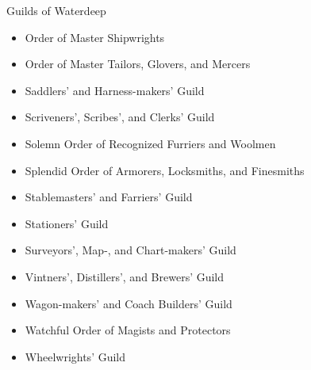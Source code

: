 \documentclass[10pt,a4paper,twoside,twocolumn,openany,nodeprecatedcode]{dndbook}
\begin{document}
\begin{DndComment}{Guilds of Waterdeep}
\begin{itemize}
\item Order of Master Shipwrights
\item Order of Master Tailors, Glovers, and Mercers
\item Saddlers' and Harness-makers' Guild
\item Scriveners', Scribes', and Clerks' Guild
\item Solemn Order of Recognized Furriers and Woolmen
\item Splendid Order of Armorers, Locksmiths, and Finesmiths
\item Stablemasters' and Farriers' Guild
\item Stationers' Guild
\item Surveyors', Map-, and Chart-makers' Guild
\item Vintners', Distillers', and Brewers' Guild
\item Wagon-makers' and Coach Builders' Guild
\item Watchful Order of Magists and Protectors
\item Wheelwrights' Guild
\end{itemize}


\end{DndComment}
\end{document}
